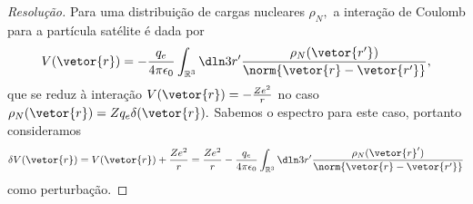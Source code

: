 \begin{proof}[Resolução]
   Para uma distribuição de cargas nucleares \(\rho_N,\) a interação de Coulomb para a partícula satélite é dada por
   \begin{equation*}
      V(\vetor{r}) = -\frac{q_e}{4\pi \epsilon_0} \int_{\mathbb{R}^3} \dln3{r'} \frac{\rho_N(\vetor{r'})}{\norm{\vetor{r} - \vetor{r'}}},
   \end{equation*}
   que se reduz à interação \(V(\vetor{r}) = -\frac{Ze^2}{r}\) no caso \(\rho_N(\vetor{r}) = Z q_e \delta(\vetor{r}).\) Sabemos o espectro para este caso, portanto consideramos
   \begin{equation*}
      \delta V(\vetor{r}) = V(\vetor{r}) + \frac{Ze^2}{r} = \frac{Z e^2}{r} - \frac{q_e}{4\pi \epsilon_0} \int_{\mathbb{R}^3} \dln3{r'}\frac{\rho_N(\vetor{r}')}{\norm{\vetor{r} - \vetor{r'}}}
   \end{equation*}
   como perturbação.


\end{proof}
